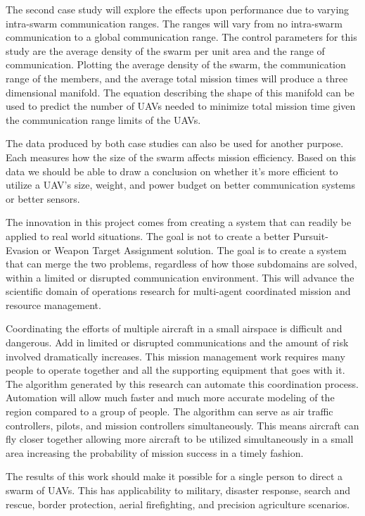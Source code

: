 The second case study will explore the effects upon performance due to varying intra-swarm communication ranges.  The ranges will vary from no intra-swarm communication to a global communication range.  The control parameters for this study are the average density of the swarm per unit area and the range of communication.  Plotting the average density of the swarm, the communication range of the members, and the average total mission times will produce a three dimensional manifold.  The equation describing the shape of this manifold can be used to predict the number of UAVs needed to minimize total mission time given the communication range limits of the UAVs.

The data produced by both case studies can also be used for another purpose.  Each measures how the size of the swarm affects mission efficiency.  Based on this data we should be able to draw a conclusion on whether it’s more efficient to utilize a UAV’s size, weight, and power budget on better communication systems or better sensors.

The innovation in this project comes from creating a system that can readily be applied to real world situations.  The goal is not to create a better Pursuit-Evasion or Weapon Target Assignment solution.  The goal is to create a system that can merge the two problems, regardless of how those subdomains are solved, within a limited or disrupted communication environment.  This will advance the scientific domain of operations research for multi-agent coordinated mission and resource management.

Coordinating the efforts of multiple aircraft in a small airspace is difficult and dangerous.  Add in limited or disrupted communications and the amount of risk involved dramatically increases.  This mission management work requires many people to operate together and all the supporting equipment that goes with it. The algorithm generated by this research can automate this coordination process.  Automation will allow much faster and much more accurate modeling of the region compared to a group of people.  The algorithm can serve as air traffic controllers, pilots, and mission controllers simultaneously.  This means aircraft can fly closer together allowing more aircraft to be utilized simultaneously in a small area increasing the probability of mission success in a timely fashion.

The results of this work should make it possible for a single person to direct a swarm of UAVs.   This has applicability to military, disaster response, search and rescue, border protection, aerial firefighting, and precision agriculture scenarios.

